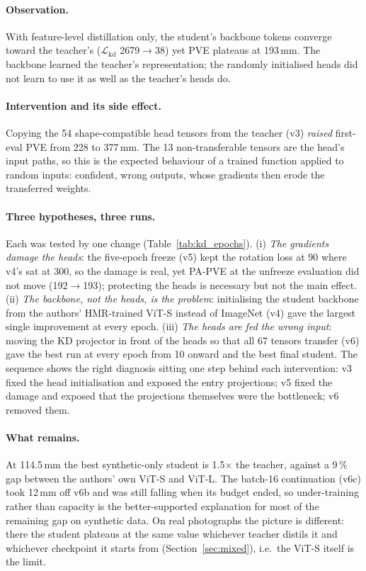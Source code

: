 \paragraph{Observation.} With feature-level distillation only, the student's
backbone tokens converge toward the teacher's ($\mathcal{L}_{\text{kd}}$
2679$\rightarrow$38) yet PVE plateaus at 193\,mm. The backbone learned the
teacher's representation; the randomly initialised heads did not learn to use
it as well as the teacher's heads do.

\paragraph{Intervention and its side effect.} Copying the 54 shape-compatible
head tensors from the teacher (v3) \emph{raised} first-eval PVE from 228 to
377\,mm. The 13 non-transferable tensors are the head's input paths, so this
is the expected behaviour of a trained function applied to random inputs:
confident, wrong outputs, whose gradients then erode the transferred weights.

\paragraph{Three hypotheses, three runs.} Each was tested by one change
(Table~\ref{tab:kd_epochs}). (i) \emph{The gradients damage the heads}: the
five-epoch freeze (v5) kept the rotation loss at 90 where v4's sat at 300, so
the damage is real, yet PA-PVE at the unfreeze evaluation did not move
(192$\rightarrow$193); protecting the heads is necessary but not the main
effect. (ii) \emph{The backbone, not the heads, is the problem}: initialising
the student backbone from the authors' HMR-trained ViT-S instead of ImageNet
(v4) gave the largest single improvement at every epoch. (iii) \emph{The heads
are fed the wrong input}: moving the KD projector in front of the heads so
that all 67 tensors transfer (v6) gave the best run at every epoch from 10
onward and the best final student. The sequence shows the right diagnosis
sitting one step behind each intervention: v3 fixed the head initialisation
and exposed the entry projections; v5 fixed the damage and exposed that the
projections themselves were the bottleneck; v6 removed them.

\paragraph{What remains.} At 114.5\,mm the best synthetic-only student is
1.5$\times$ the teacher, against a 9\,\% gap between the authors' own ViT-S
and ViT-L. The batch-16 continuation (v6c) took 12\,mm off v6b and was still
falling when its budget ended, so under-training rather than capacity is the
better-supported explanation for most of the remaining gap on synthetic data.
On real photographs the picture is different: there the student plateaus at
the same value whichever teacher distils it and whichever checkpoint it starts
from (Section~\ref{sec:mixed}), i.e.\ the ViT-S itself is the limit.

